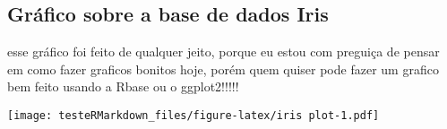 \documentclass[
]{article}
\begin{document}
\hypertarget{gruxe1fico-sobre-a-base-de-dados-iris}{%
\subsection{Gráfico sobre a base de dados
Iris}\label{gruxe1fico-sobre-a-base-de-dados-iris}}

esse gráfico foi feito de qualquer jeito, porque eu estou com preguiça
de pensar em como fazer graficos bonitos hoje, porém quem quiser pode
fazer um grafico bem feito usando a Rbase ou o ggplot2!!!!!

\texttt{[image: testeRMarkdown\_files/figure-latex/iris plot-1.pdf]}
\end{document}
